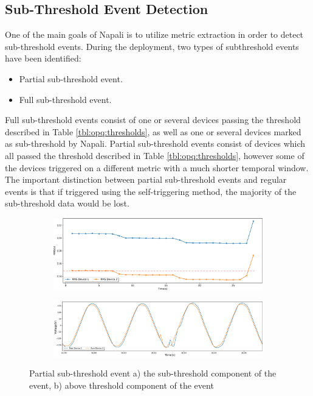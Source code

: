 \subsection{Sub-Threshold Event Detection}\label{subsec:sub-threshold-event-detection}

One of the main goals of Napali is to utilize metric extraction in order to detect sub-threshold events.
During the deployment, two types of subthreshold events have been identified:
\begin{itemize}
    \item Partial sub-threshold event.
    \item Full sub-threshold event.
\end{itemize}
Full sub-threshold events consist of one or several devices passing the threshold described in Table \ref{tbl:opq:thresholds},
as well as one or several devices marked as sub-threshold by Napali.
Partial sub-threshold events consist of devices which all passed the threshold described in Table \ref{tbl:opq:thresholds}, however some of the devices triggered on a different metric with a much shorter temporal window.
The important distinction between partial sub-threshold events and regular events is that if triggered using the self-triggering method, the majority of the sub-threshold data would be lost.

\begin{figure}[h]
    \centering
    \begin{subfigure}{1\textwidth}
        \centering
        \includegraphics[width=1\linewidth]{img/napali_eval/rms_gridwide_subthreshold.pdf}
        \caption{}
        \label{fig:expdes:8:1}
    \end{subfigure}%

    \begin{subfigure}{1\textwidth}
        \centering
        \includegraphics[width=1\linewidth]{img/napali_eval/raw_gridwide_subthreshold_zoom.pdf}
        \caption{}
        \label{fig:expdes:8:2}
    \end{subfigure}
    \caption{Partial sub-threshold event a) the sub-threshold component of the event, b) above threshold component of the event}
    \label{fig:expdes:8}
\end{figure}

